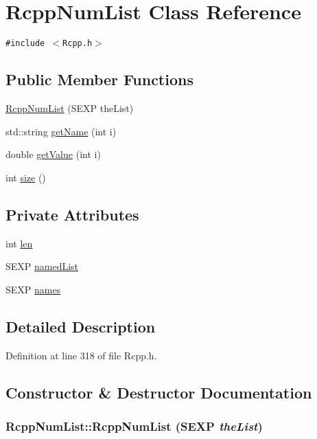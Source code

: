 \hypertarget{classRcppNumList}{
\section{RcppNumList Class Reference}
\label{classRcppNumList}
}
{\tt \#include $<$Rcpp.h$>$}

\subsection*{Public Member Functions}
\begin{CompactItemize}
\item 
\hyperlink{classRcppNumList_4a8a321d0dc84b6d4be988005fa74fcd}{RcppNumList} (SEXP theList)
\item 
std::string \hyperlink{classRcppNumList_246d8e534d97fbe798b8567bbfa93ca7}{getName} (int i)
\item 
double \hyperlink{classRcppNumList_2e83950933ddc73ad64ed800f6f5e23b}{getValue} (int i)
\item 
int \hyperlink{classRcppNumList_18dc0660cc827bcf17d9738cb5874db7}{size} ()
\end{CompactItemize}
\subsection*{Private Attributes}
\begin{CompactItemize}
\item 
int \hyperlink{classRcppNumList_c4cb5c784f7105f0f28ae48d02deb3a1}{len}
\item 
SEXP \hyperlink{classRcppNumList_7464927aafe555a0c4a104247dba7185}{namedList}
\item 
SEXP \hyperlink{classRcppNumList_a669b28cba0c95531a3c92910a60ecb0}{names}
\end{CompactItemize}


\subsection{Detailed Description}


Definition at line 318 of file Rcpp.h.

\subsection{Constructor \& Destructor Documentation}
\hypertarget{classRcppNumList_4a8a321d0dc84b6d4be988005fa74fcd}{
\subsubsection[RcppNumList]{\setlength{\rightskip}{0pt plus 5cm}RcppNumList::RcppNumList (SEXP {\em theList})}}
\label{classRcppNumList_4a8a321d0dc84b6d4be988005fa74fcd}




